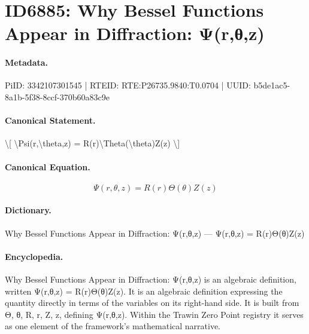 \section*{ID6885: Why Bessel Functions Appear in Diffraction: Ψ(r,θ,z)}
\paragraph{Metadata.}
PiID: 3342107301545 | RTEID: RTE:P26735.9840:T0.0704 | UUID: b5de1ac5-8a1b-5f38-8ccf-370b60a83c9e

\paragraph{Canonical Statement.}
\textbackslash{}[ \textbackslash{}Psi(r,\textbackslash{}theta,z) = R(r)\textbackslash{}Theta(\textbackslash{}theta)Z(z) \textbackslash{}]

\paragraph{Canonical Equation.}
\[
\Psi(r,\theta,z) = R(r)\Theta(\theta)Z(z)
\]

\paragraph{Dictionary.}
Why Bessel Functions Appear in Diffraction: Ψ(r,θ,z) — Ψ(r,θ,z) = R(r)Θ(θ)Z(z)

\paragraph{Encyclopedia.}
Why Bessel Functions Appear in Diffraction: Ψ(r,θ,z) is an algebraic definition, written Ψ(r,θ,z) = R(r)Θ(θ)Z(z). It is an algebraic definition expressing the quantity directly in terms of the variables on its right-hand side. It is built from Θ, θ, R, r, Z, z, defining Ψ(r,θ,z). Within the Trawin Zero Point registry it serves as one element of the framework's mathematical narrative.
